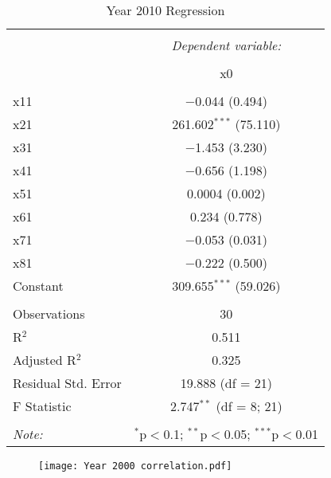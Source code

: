 \documentclass{article}
\begin{document}
\begin{table}[!htbp] \centering 
  \caption{Year 2010 Regression} 
  \label{} 
\begin{tabular}{@{\extracolsep{1pt}}lc} 
\\[-1.8ex]\hline 
\hline \\[-1.8ex] 
 & \multicolumn{1}{c}{\textit{Dependent variable:}} \\ 
\cline{2-2} 
\\[-1.8ex] & x0 \\ 
\hline \\[-1.8ex] 
 x11 & $-$0.044 (0.494) \\ 
  x21 & 261.602$^{***}$ (75.110) \\ 
  x31 & $-$1.453 (3.230) \\ 
  x41 & $-$0.656 (1.198) \\ 
  x51 & 0.0004 (0.002) \\ 
  x61 & 0.234 (0.778) \\ 
  x71 & $-$0.053 (0.031) \\ 
  x81 & $-$0.222 (0.500) \\ 
  Constant & 309.655$^{***}$ (59.026) \\ 
 \hline \\[-1.8ex] 
Observations & 30 \\ 
R$^{2}$ & 0.511 \\ 
Adjusted R$^{2}$ & 0.325 \\ 
Residual Std. Error & 19.888 (df = 21) \\ 
F Statistic & 2.747$^{**}$ (df = 8; 21) \\ 
\hline 
\hline \\[-1.8ex] 
\textit{Note:}  & \multicolumn{1}{r}{$^{*}$p$<$0.1; $^{**}$p$<$0.05; $^{***}$p$<$0.01} \\ 
\end{tabular} 
\end{table} 
\newpage

\newpage 

\begin{figure}[!hb]
\centering
\texttt{[image: Year 2000 correlation.pdf]}
\end{figure}\\
\newpage
\end{document}
